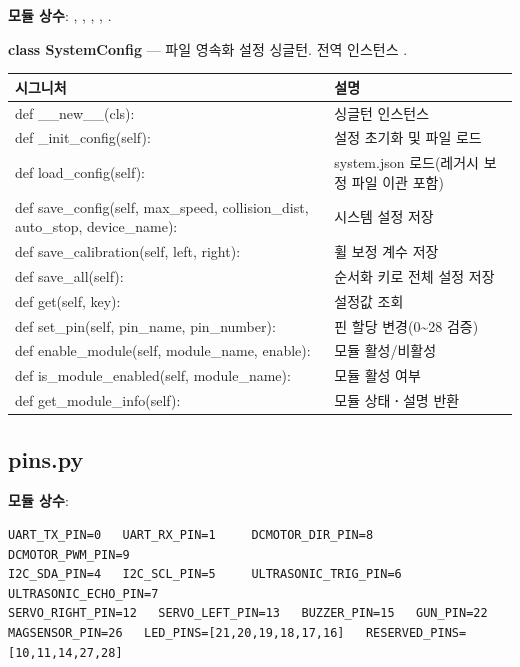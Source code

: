 \noindent\textbf{모듈 상수}: ,
,
, , .

\noindent\textbf{class SystemConfig} --- 파일 영속화 설정 싱글턴.
전역 인스턴스 .

\begin{longtable}{S{7.8cm} L{6.2cm}}
\toprule
{}\normalfont\sffamily\bfseries 시그니처 & \normalfont\sffamily\bfseries 설명 \\
\midrule
\endhead
def \_\_new\_\_(cls): & 싱글턴 인스턴스 \\
def \_init\_config(self): & 설정 초기화 및 파일 로드 \\
def load\_config(self): & system.json 로드(레거시 보정 파일 이관 포함) \\
def save\_config(self, max\_speed, collision\_dist, auto\_stop, device\_name): & 시스템 설정 저장 \\
def save\_calibration(self, left, right): & 휠 보정 계수 저장 \\
def save\_all(self): & 순서화 키로 전체 설정 저장 \\
def get(self, key): & 설정값 조회 \\
def set\_pin(self, pin\_name, pin\_number): & 핀 할당 변경(0\textasciitilde 28 검증) \\
def enable\_module(self, module\_name, enable): & 모듈 활성/비활성 \\
def is\_module\_enabled(self, module\_name): & 모듈 활성 여부 \\
def get\_module\_info(self): & 모듈 상태\textbf{·}설명 반환 \\
\bottomrule
\end{longtable}

\subsection{pins.py}

\noindent\textbf{모듈 상수}:
\begin{verbatim}
UART_TX_PIN=0   UART_RX_PIN=1     DCMOTOR_DIR_PIN=8   DCMOTOR_PWM_PIN=9
I2C_SDA_PIN=4   I2C_SCL_PIN=5     ULTRASONIC_TRIG_PIN=6  ULTRASONIC_ECHO_PIN=7
SERVO_RIGHT_PIN=12   SERVO_LEFT_PIN=13   BUZZER_PIN=15   GUN_PIN=22
MAGSENSOR_PIN=26   LED_PINS=[21,20,19,18,17,16]   RESERVED_PINS=[10,11,14,27,28]
\end{verbatim}

